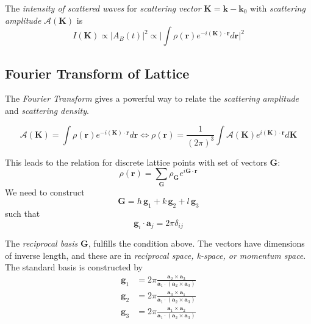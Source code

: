 The \emph{intensity of scattered waves} for \emph{scattering vector} $\mathbf{K}=\mathbf{k}-\mathbf{k}_0$ with \emph{scattering amplitude} $\mathcal{A}(\mathbf{K})$ is
\begin{equation*}
    I(\mathbf{K}) \propto |A_B(t)|^2 \propto \bigg|\int \rho(\mathbf{r})e^{-i(\mathbf{K})\cdot \mathbf{r}} d\mathbf{r}\bigg|^2
\end{equation*}


\subsection{Fourier Transform of Lattice}
The \emph{Fourier Transform} gives a powerful way to relate the \emph{scattering amplitude} and \emph{scattering density}.

\begin{equation}
    \mathcal{A}(\mathbf{K}) = \int \rho(\mathbf{r})e^{-i(\mathbf{K})\cdot \mathbf{r}} d\mathbf{r} \iff \rho(\mathbf{r}) = \frac{1}{(2\pi)^3} \int \mathcal{A}(\mathbf{K}) e^{i(\mathbf{K})\cdot \mathbf{r}} d\mathbf{K}
\end{equation}

This leads to the relation for discrete lattice points with set of vectors $\mathbf{G}$:
\begin{equation}
    \rho (\mathbf{r}) = \sum_\mathbf{G} \rho_\mathbf{G} e^{i\mathbf{G}\cdot \mathbf{r}}
\end{equation}
We need to construct 
\begin{equation}
    \mathbf{G} = h \,\mathbf{g}_1 + k \,\mathbf{g}_2 + l \,\mathbf{g}_3
\end{equation}
such that
\begin{equation}
    \mathbf{g}_i \cdot \mathbf{a}_j = 2\pi \delta_{ij}
\end{equation}

The \emph{reciprocal basis} $\mathbf{G}$, fulfills the condition above. The vectors have dimensions of inverse length, and these are in \emph{reciprocal space, k-space, or momentum space}. The standard basis is constructed by
\begin{align*}
    \mathbf{g}_1 & = 2\pi \frac{\mathbf{a}_2\times\mathbf{a}_3}{\mathbf{a}_1\cdot(\mathbf{a}_2\times\mathbf{a}_3)} \\
    \mathbf{g}_2 & = 2\pi \frac{\mathbf{a}_3\times\mathbf{a}_1}{\mathbf{a}_1\cdot(\mathbf{a}_2\times\mathbf{a}_3)} \\
    \mathbf{g}_3 & = 2\pi \frac{\mathbf{a}_1\times\mathbf{a}_2}{\mathbf{a}_1\cdot(\mathbf{a}_2\times\mathbf{a}_3)} \\
\end{align*}

